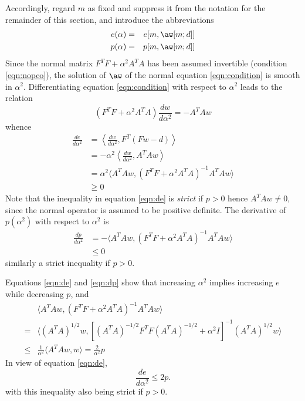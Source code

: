 Accordingly, regard $m$ as fixed and suppress it from the notation for the remainder of this section, and introduce the abbreviations
\begin{eqnarray}
\label{eqn:erralph}
e(\alpha) &=& e[m,\aw[m;d]]\\
\label{eqn:penalph}
p(\alpha) &=& p[m,\aw[m;d]]
\end{eqnarray}
Since the normal matrix $F^T F + \alpha^2 A^T A$ has been assumed
invertible (condition \ref{eqn:nopco}), the solution of $\aw$ of the
normal equation \ref{eqn:condition} is smooth in $\alpha^2$.
Differentiating equation \ref{eqn:condition} with respect to  $\alpha^2$ leads to the relation
\begin{equation}
(F^T F + \alpha^2 A^T A ) \frac{dw}{d\alpha^2} = -A^T A w
\label{eqn:dnorm}
\end{equation}
whence
\begin{align}
\frac{de}{d\alpha^2} 
&=\left\langle\frac{dw}{d\alpha^2},F^T(Fw-d) \right\rangle \nonumber \\
&=-\alpha^2\left\langle\frac{dw}{d\alpha^2},A^TAw\right\rangle \nonumber \\ 
&=\alpha^2 \langle A^TAw,(F^TF + \alpha^2 A^TA)^{-1}A^TAw\rangle \nonumber \\
&\ge 0
\label{eqn:de}
\end{align}
Note that the inequality in equation \ref{eqn:de} is {\em strict}  if $p > 0$ hence $A^TAw \ne 0$, since the normal operator is assumed to be positive definite.
The derivative of $p(\alpha^2)$ with respect to $\alpha^2$ is
\begin{align}
\frac{dp}{d\alpha^2} &=  -\langle A^T Aw,(F^TF + \alpha^2 A^TA)^{-1}A^TAw \rangle \nonumber \\
&\leq 0
\label{eqn:dp}
\end{align}
similarly a strict inequality if $p > 0$.

Equations \ref{eqn:de} and \ref{eqn:dp} show that increasing $\alpha^2$ implies increasing $e$ while decreasing $p$, and
\begin{align}
&\langle A^TA w,(F^TF + \alpha^2 A^TA)^{-1} A^TA w \rangle \nonumber \\ 
=& \langle (A^TA)^{1/2}w,[(A^TA)^{-1/2}F^TF(A^TA)^{-1/2} + \alpha^2 I]^{-1}(A^TA)^{1/2}w \rangle \nonumber \\ 
\le& \frac{1}{\alpha^2} \langle A^TA w, w\rangle = \frac{2}{\alpha^2}p
\end{align}
In view of equation \ref{eqn:de},
\begin{equation}
\label{eqn:lep}
\frac{de}{d\alpha^2}  \le 2p.
\end{equation}
with this inequality also being strict if $p > 0$.

